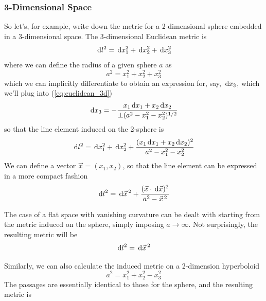\subsubsection*{3-Dimensional Space}

So let's, for example, write down the metric for a 2-dimensional sphere embedded in a 3-dimensional space. The 3-dimensional Euclidean metric is
\begin{equation}
    \,\text{d}l^{2} = \,\text{d}x_{1}^{2}+\,\text{d}x_{2}^{2}+\,\text{d}x_{3}^{2}
    \label{eq:euclidean_3d}
\end{equation}
where we can define the radius of a given sphere $a$ as
\begin{equation}
    a^{2} = x_{1}^{2}+x_{2}^{2}+x_{3}^{2}
\end{equation}
which we can implicitly differentiate to obtain an expression for, say, $\,\text{d}x_{3}$, which we'll plug into (\ref{eq:euclidean_3d})
\begin{equation}
    \,\text{d}x_{3} = -\frac{x_{1}\,\text{d}x_{1}+x_{2}\,\text{d}x_{2}}{\pm (a^{2}-x_{1}^{2}-x_{2}^{2})^{1/2}}
\end{equation}
so that the line element induced on the 2-sphere is
\begin{equation}
    \,\text{d}l^{2} = \,\text{d}x_{1}^{2}+\,\text{d}x_{2}^{2} + \frac{(x_{1}\,\text{d}x_{1}+x_{2}\,\text{d}x_{2})^{2}}{a^{2}-x_{1}^{2}-x_{2}^{2}}
\end{equation}
We can define a vector $\vec{x} = (x_{1}, x_{2})$, so that the line element can be expressed in a more compact fashion
\begin{equation}
    \,\text{d}l^{2} = \,\text{d}\vec{x}^{\,2} + \frac{(\vec{x}\cdot\,\text{d}\vec{x})^{2}}{a^{2}-\vec{x}^{\,2}}
\end{equation}
\begin{tcolorbox}[enhanced,attach boxed title to top center={yshift=-3mm,yshifttext=-1mm},
  colback=blue!5!white,colframe=blue!75!black,colbacktitle=blue!80!black,
  title=Flat Space,
  boxed title style={size=small,colframe=blue!50!black}]
  The case of a flat space with vanishing curvature can be dealt with starting from the metric induced on the sphere, simply imposing $a\to \infty$. Not surprisingly, the resulting metric will be
  $$ \,\text{d}l^{2} = \,\text{d}\vec{x}^{\,2} $$
\end{tcolorbox}
Similarly, we can also calculate the induced metric on a 2-dimension hyperboloid
\begin{equation}
    a^{2} = x_{1}^{2}+x_{2}^{2}-x_{3}^{2}
\end{equation}
The passages are essentially identical to those for the sphere, and the resulting metric is
